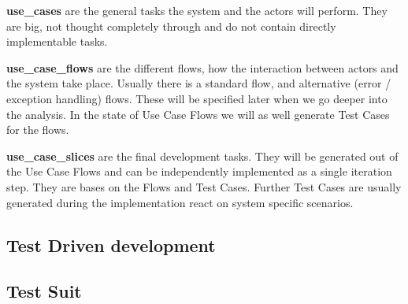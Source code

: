 \textbf{\glspl{use_case}} are the general tasks the system and the actors will perform. They are big, not thought completely through and do not contain directly implementable tasks.

\textbf{\glspl{use_case_flow}} are the different flows, how the interaction between actors and the system take place. Usually there is a standard flow, and alternative (error / exception handling) flows. These will be specified later when we go deeper into the analysis. In the state of Use Case Flows we will as well generate Test Cases for the flows. 

\textbf{\glspl{use_case_slice}} are the final development tasks. They will be generated out of the Use Case Flows and can be independently implemented as a single iteration step. They are bases on the Flows and Test Cases. Further Test Cases are usually generated during the implementation react on system specific scenarios.


\subsection{Test Driven development}
\label{sec:tdd}

\subsection{Test Suit}
\label{sub:test_suit}

